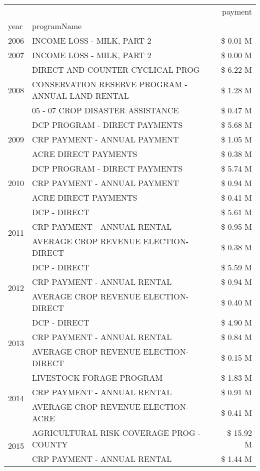 \begin{tabular}{llr}
\toprule
 &  & payment \\
year & programName &  \\
\midrule
2006 & INCOME LOSS - MILK, PART 2 & \$ 0.01 M \\
\cline{1-3}
2007 & INCOME LOSS - MILK, PART 2 & \$ 0.00 M \\
\cline{1-3}
\multirow[t]{3}{*}{2008} & DIRECT AND COUNTER CYCLICAL PROG & \$ 6.22 M \\
 & CONSERVATION RESERVE PROGRAM - ANNUAL LAND RENTAL & \$ 1.28 M \\
 & 05 - 07 CROP DISASTER ASSISTANCE & \$ 0.47 M \\
\cline{1-3}
\multirow[t]{3}{*}{2009} & DCP PROGRAM - DIRECT PAYMENTS & \$ 5.68 M \\
 & CRP PAYMENT - ANNUAL PAYMENT & \$ 1.05 M \\
 & ACRE DIRECT PAYMENTS & \$ 0.38 M \\
\cline{1-3}
\multirow[t]{3}{*}{2010} & DCP PROGRAM - DIRECT PAYMENTS & \$ 5.74 M \\
 & CRP PAYMENT - ANNUAL PAYMENT & \$ 0.94 M \\
 & ACRE DIRECT PAYMENTS & \$ 0.41 M \\
\cline{1-3}
\multirow[t]{3}{*}{2011} & DCP - DIRECT & \$ 5.61 M \\
 & CRP PAYMENT - ANNUAL RENTAL & \$ 0.95 M \\
 & AVERAGE CROP REVENUE ELECTION-DIRECT & \$ 0.38 M \\
\cline{1-3}
\multirow[t]{3}{*}{2012} & DCP - DIRECT & \$ 5.59 M \\
 & CRP PAYMENT - ANNUAL RENTAL & \$ 0.94 M \\
 & AVERAGE CROP REVENUE ELECTION-DIRECT & \$ 0.40 M \\
\cline{1-3}
\multirow[t]{3}{*}{2013} & DCP - DIRECT & \$ 4.90 M \\
 & CRP PAYMENT - ANNUAL RENTAL & \$ 0.84 M \\
 & AVERAGE CROP REVENUE ELECTION-DIRECT & \$ 0.15 M \\
\cline{1-3}
\multirow[t]{3}{*}{2014} & LIVESTOCK FORAGE PROGRAM & \$ 1.83 M \\
 & CRP PAYMENT - ANNUAL RENTAL & \$ 0.91 M \\
 & AVERAGE CROP REVENUE ELECTION-ACRE & \$ 0.41 M \\
\cline{1-3}
\multirow[t]{3}{*}{2015} & AGRICULTURAL RISK COVERAGE PROG - COUNTY & \$ 15.92 M \\
 & CRP PAYMENT - ANNUAL RENTAL & \$ 1.44 M \\

\end{tabular}
